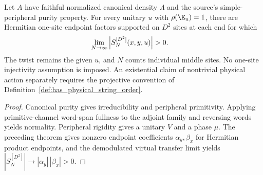 \begin{lemma}
    \label{thm:physical_block_order_pure_canonical}
    \leanok
    Let $A$ have faithful normalized canonical density $\Lambda$ and the
    source's simple-peripheral purity property. For every unitary $u$ with
    $\rho(\E_u)=1$, there are Hermitian one-site endpoint factors supported
    on $D^2$ sites at each end for which
    \begin{align}
        \lim_{N\to\infty}\left|S_N^{[D^2]}(x,y,u)\right| & >0.
        \notag
    \end{align}
    The twist remains the given $u$, and $N$ counts individual middle
    sites. No one-site injectivity assumption is imposed. An existential
    claim of nontrivial physical action separately requires the projective
    convention of Definition~\ref{def:has_physical_string_order}.
\end{lemma}
\begin{proof}\leanok
    Canonical purity gives irreducibility and peripheral primitivity.
    Applying primitive-channel word-span fullness to the adjoint family and
    reversing words yields normality. Peripheral rigidity gives a
    unitary $V$ and a phase $\mu$. The preceding theorem gives nonzero
    endpoint coefficients $\alpha_y,\beta_x$ for Hermitian product
    endpoints, and the demodulated virtual transfer limit yields
    $|S_N^{[D^2]}|\to|\alpha_y|\,|\beta_x|>0$.
\end{proof}
